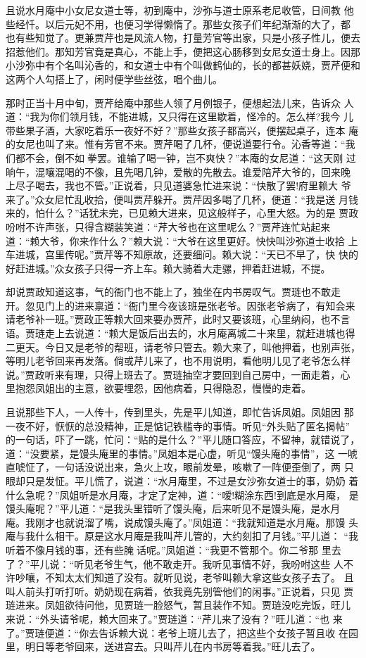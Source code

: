 且说水月庵中小女尼女道士等，初到庵中，沙弥与道士原系老尼收管，日间教
他些经忏。以后元妃不用，也便习学得懒惰了。那些女孩子们年纪渐渐的大了，都
也有些知觉了。更兼贾芹也是风流人物，打量芳官等出家，只是小孩子性儿，便去
招惹他们。那知芳官竟是真心，不能上手，便把这心肠移到女尼女道士身上。因那
小沙弥中有个名叫沁香的，和女道士中有个叫做鹤仙的，长的都甚妖娆，贾芹便和
这两个人勾搭上了，闲时便学些丝弦，唱个曲儿。

那时正当十月中旬，贾芹给庵中那些人领了月例银子，便想起法儿来，告诉众
人道：“我为你们领月钱，不能进城，又只得在这里歇着，怪冷的。怎么样?我今
儿带些果子酒，大家吃着乐一夜好不好？”那些女孩子都高兴，便摆起桌子，连本
庵的女尼也叫了来。惟有芳官不来。贾芹喝了几杯，便说道要行令。沁香等道：“我
们都不会，倒不如拳罢。谁输了喝一钟，岂不爽快？”本庵的女尼道：“这天刚
过晌午，混嚷混喝的不像，且先喝几钟，爱散的先散去。谁爱陪芹大爷的，回来晚
上尽子喝去，我也不管。”正说着，只见道婆急忙进来说：“快散了罢!府里赖大
爷来了。”众女尼忙乱收拾，便叫贾芹躲开。贾芹因多喝了几杯，便道：“我是送
月钱来的，怕什么？”话犹未完，已见赖大进来，见这般样子，心里大怒。为的是
贾政吩咐不许声张，只得含糊装笑道：“芹大爷也在这里呢么？”贾芹连忙站起来
道：“赖大爷，你来作什么？”赖大说：“大爷在这里更好。快快叫沙弥道士收拾
上车进城，宫里传呢。”贾芹等不知原故，还要细问。赖大说：“天已不早了，快
快的好赶进城。”众女孩子只得一齐上车。赖大骑着大走骡，押着赶进城，不提。

却说贾政知道这事，气的衙门也不能上了，独坐在内书房叹气。贾琏也不敢走
开。忽见门上的进来禀道：“衙门里今夜该班是张老爷。因张老爷病了，有知会来
请老爷补一班。”贾政正等赖大回来要办贾芹，此时又要该班，心里纳闷，也不言
语。贾琏走上去说道：“赖大是饭后出去的，水月庵离城二十来里，就赶进城也得
二更天。今日又是老爷的帮班，请老爷只管去。赖大来了，叫他押着，也别声张，
等明儿老爷回来再发落。倘或芹儿来了，也不用说明，看他明儿见了老爷怎么样
说。”贾政听来有理，只得上班去了。贾琏抽空才要回到自己房中，一面走着，心
里抱怨凤姐出的主意，欲要埋怨，因他病着，只得隐忍，慢慢的走着。

且说那些下人，一人传十，传到里头，先是平儿知道，即忙告诉凤姐。凤姐因
那一夜不好，恹恹的总没精神，正是惦记铁槛寺的事情。听见“外头贴了匿名揭帖”
的一句话，吓了一跳，忙问：“贴的是什么？”平儿随口答应，不留神，就错说了，
道：“没要紧，是馒头庵里的事情。”凤姐本是心虚，听见“馒头庵的事情”，这
一唬直唬怔了，一句话没说出来，急火上攻，眼前发晕，咳嗽了一阵便歪倒了，两
只眼却只是发怔。平儿慌了，说道：“水月庵里，不过是女沙弥女道士的事，奶奶
着什么急呢？”凤姐听是水月庵，才定了定神，道：“嗳!糊涂东西!到底是水月庵，
是馒头庵呢？”平儿道：“是我头里错听了馒头庵，后来听见不是馒头庵，是水月
庵。我刚才也就说溜了嘴，说成馒头庵了。”凤姐道：“我就知道是水月庵。那馒
头庵与我什么相干。原是这水月庵是我叫芹儿管的，大约刻扣了月钱。”平儿道：
“我听着不像月钱的事，还有些腌话呢。”凤姐道：“我更不管那个。你二爷那
里去了？”平儿说：“听见老爷生气，他不敢走开。我听见事情不好，我吩咐这些
人不许吵嚷，不知太太们知道了没有。就听见说，老爷叫赖大拿这些女孩子去了。
且叫人前头打听打听。奶奶现在病着，依我竟先别管他们的闲事。”正说着，只见
贾琏进来。凤姐欲待问他，见贾琏一脸怒气，暂且装作不知。贾琏没吃完饭，旺儿
来说：“外头请爷呢，赖大回来了。”贾琏道：“芹儿来了没有？”旺儿道：“也
来了。”贾琏便道：“你去告诉赖大说：老爷上班儿去了，把这些个女孩子暂且收
在园里，明日等老爷回来，送进宫去。只叫芹儿在内书房等着我。”旺儿去了。

